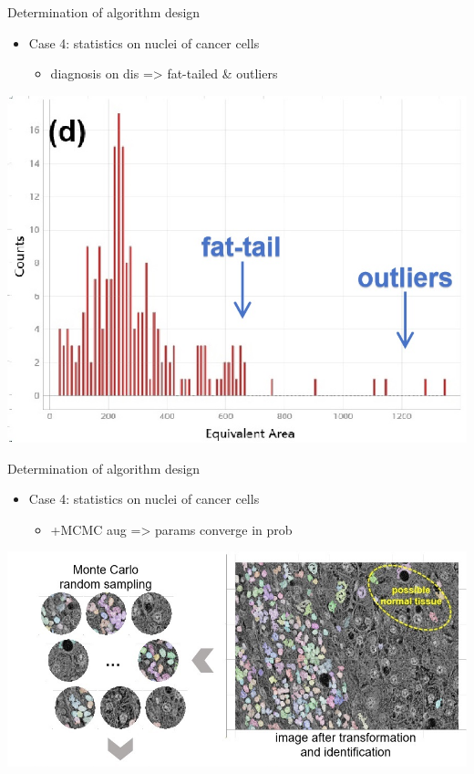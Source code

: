 \documentclass[11pt]{beamer}
\newcommand{\uniitem}[1]{\begin{itemize}\item #1 \end{itemize}}
\begin{document}
\begin{frame}{Determination of algorithm design}
	\uniitem{Case 4: statistics on nuclei of cancer cells
		\uniitem{diagnosis on dis => fat-tailed \& outliers}}
	\centering
	\includegraphics[scale=0.6]{pathlocal.jpg}
\end{frame}

\begin{frame}{Determination of algorithm design}
	\uniitem{Case 4: statistics on nuclei of cancer cells
		\uniitem{+MCMC aug => params converge in prob}}
	\centering
	\includegraphics[scale=0.75]{mcmc1.jpg}
\end{frame}
\end{document}
